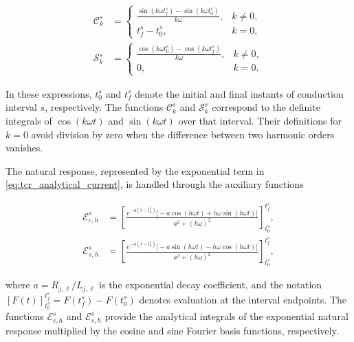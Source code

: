 \documentclass[journal]{IEEEtran}
\begin{document}
\begin{subequations}
\label{eq:tcr_endpoint_kernels}
\begin{align}
    \mathcal C_k^s&=
    \begin{cases}
    \displaystyle\frac{\sin(k\omega t_f^s)-\sin(k\omega t_0^s)}
    {k\omega},&k\ne0,\\[2mm]
    t_f^s-t_0^s,&k=0,
    \end{cases}\\
    \mathcal S_k^s&=
    \begin{cases}
    \displaystyle\frac{\cos(k\omega t_0^s)-\cos(k\omega t_f^s)}
    {k\omega},&k\ne0,\\[2mm]
    0,&k=0.
    \end{cases}
\end{align}
\end{subequations}

In these expressions, $t_0^s$ and $t_f^s$ denote the initial and
final instants of conduction interval $s$, respectively. The functions
$\mathcal C_k^s$ and $\mathcal S_k^s$ correspond to the definite
integrals of $\cos(k\omega t)$ and $\sin(k\omega t)$ over that interval.
Their definitions for $k=0$ avoid division by zero when the difference
between two harmonic orders vanishes.

The natural response, represented by the exponential term in
\eqref{eq:tcr_analytical_current}, is handled through the auxiliary
functions

\begin{subequations}
\label{eq:tcr_exponential_kernels}
\begin{align}
    \mathcal E_{c,h}^s
    &=\left[
    \frac{e^{-a(t-t_0^s)}
    \bigl[-a\cos(h\omega t)+h\omega\sin(h\omega t)\bigr]}
    {a^2+(h\omega)^2}
    \right]_{t_0^s}^{t_f^s},\\
    \mathcal E_{s,h}^s
    &=\left[
    \frac{e^{-a(t-t_0^s)}
    \bigl[-a\sin(h\omega t)-h\omega\cos(h\omega t)\bigr]}
    {a^2+(h\omega)^2}
    \right]_{t_0^s}^{t_f^s},
\end{align}
\end{subequations}

where $a=R_{j,\ell}/L_{j,\ell}$ is the exponential decay coefficient,
and the notation
$[F(t)]_{t_0^s}^{t_f^s}=F(t_f^s)-F(t_0^s)$ denotes evaluation
at the interval endpoints. The functions $\mathcal E_{c,h}^s$
and $\mathcal E_{s,h}^s$ provide the analytical integrals of the
exponential natural response multiplied by the cosine and sine
Fourier basis functions, respectively.
\end{document}
